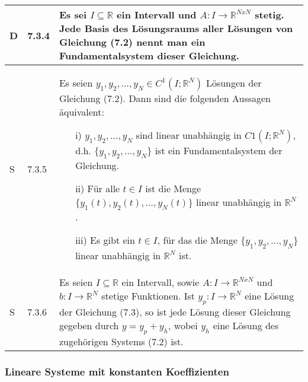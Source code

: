 \begin{longtable}{p{0.75cm} p{1cm} p{16cm}}
        \midrule
        D   & 7.3.4 &   Es sei $I \subseteq \mathbb{R}$ ein Intervall und $A:I \rightarrow \mathbb{R}^{NxN}$ stetig. Jede Basis des Lösungsraums aller
                        Lösungen von Gleichung (7.2) nennt man ein Fundamentalsystem dieser Gleichung. \\
        \midrule
        S   & 7.3.5 &   Es seien $y_1, y_2, \dots, y_N \in C^1 (I; \mathbb{R}^N)$ Lösungen der Gleichung (7.2). Dann sind die folgenden
                        Aussagen äquivalent: 
                        \begin{itemize}[topsep=-0.5cm]
                            \item[i)] $y_1,y_2,\dots,y_N$ sind linear unabhängig in $C 1(I; \mathbb{R}^N)$, d.h. $\{y_1,y_2,\dots,y_N \}$ ist ein
                                        Fundamentalsystem der Gleichung.
                            \item[ii)] Für alle $t \in I$ ist die Menge $\{ y_1(t), y_2(t), \dots, y_N(t)\}$ linear unabhängig in $\mathbb{R}^N$.
                            \item[iii)] Es gibt ein $t\in I$, für das die Menge $\{y_1,y_2,\dots,y_N \}$ linear unabhängig in $\mathbb{R}^N$ ist. 
                        \end{itemize} \vspace{-0cm} \\
        \midrule
        S   & 7.3.6 &   Es seien $I \subseteq \mathbb{R}$ ein Intervall, sowie $A: I \rightarrow \mathbb{R}^{NxN}$ und $b: I \rightarrow \mathbb{R}^N$
                        stetige Funktionen. Ist $y_p:I \rightarrow \mathbb{R}^N$ eine Lösung der Gleichung (7.3), so ist jede Lösung dieser Gleichung 
                        gegeben durch $y = y_p + y_h$, wobei $y_h$ eine Lösung des zugehörigen Systems (7.2) ist.\\
        \bottomrule

    \end{longtable}

\subsubsection{Lineare Systeme mit konstanten Koeffizienten}

